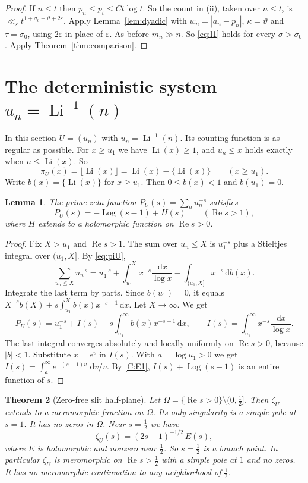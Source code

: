 \documentclass[12pt,letterpaper]{article}
\newtheorem{theorem}{Theorem}[section]
\newtheorem{lemma}[theorem]{Lemma}
\theoremstyle{definition}
\theoremstyle{remark}
\numberwithin{equation}{section}
\newcommand{\Li}{\operatorname{Li}}
\newcommand{\Log}{\operatorname{Log}}
\newcommand{\Ree}{\operatorname{Re}}
\newcommand{\dd}{\,\mathrm{d}}
\newcommand{\eps}{\varepsilon}
\begin{document}
\begin{proof}
If $n\le t$ then $p_n\le p_t\le Ct\log t$. So the count in (ii), taken over
$n\le t$, is $\ll_\eps t^{1+\sigma_0-\vartheta+2\eps}$. Apply
Lemma~\ref{lem:dyadic} with $w_n=|a_n-p_n|$, $\kappa=\vartheta$ and
$\tau=\sigma_0$, using $2\eps$ in place of $\eps$. As before
$m_n\gg n$. So \eqref{eq:l1} holds for every $\sigma>\sigma_0$. Apply
Theorem~\ref{thm:comparison}.
\end{proof}

\section{The deterministic system \texorpdfstring{$u_n=\Li^{-1}(n)$}{u\_n = Li\^{}(-1)(n)}}
\label{sec:deterministic}

In this section $U=(u_n)$ with $u_n=\Li^{-1}(n)$. Its counting function is
as regular as possible. For $x\ge u_1$ we have $\Li(x)\ge1$, and $u_n\le x$
holds exactly when $n\le\Li(x)$. So
\begin{equation}\label{eq:piU}
\pi_U(x)=\lfloor\Li(x)\rfloor=\Li(x)-\{\Li(x)\}\qquad(x\ge u_1).
\end{equation}
Write $b(x)=\{\Li(x)\}$ for $x\ge u_1$. Then $0\le b(x)<1$ and $b(u_1)=0$.

\begin{lemma}\label{lem:PU}
The prime zeta function $P_U(s)=\sum_n u_n^{-s}$ satisfies
\[
P_U(s)=-\Log(s-1)+H(s)\qquad(\Ree s>1),
\]
where $H$ extends to a holomorphic function on $\Ree s>0$.
\end{lemma}

\begin{proof}
Fix $X>u_1$ and $\Ree s>1$. The sum over $u_n\le X$ is $u_1^{-s}$ plus a
Stieltjes integral over $(u_1,X]$. By \eqref{eq:piU},
\[
\sum_{u_n\le X}u_n^{-s}
=u_1^{-s}+\int_{u_1}^X x^{-s}\frac{\dd x}{\log x}
-\int_{(u_1,X]}x^{-s}\dd b(x).
\]
Integrate the last term by parts. Since $b(u_1)=0$, it equals
$X^{-s}b(X)+s\int_{u_1}^X b(x)x^{-s-1}\dd x$. Let $X\to\infty$. We get
\[
P_U(s)=u_1^{-s}+I(s)-s\int_{u_1}^\infty b(x)x^{-s-1}\dd x,
\qquad I(s)=\int_{u_1}^\infty x^{-s}\frac{\dd x}{\log x}.
\]
The last integral converges absolutely and locally uniformly on $\Ree s>0$,
because $|b|<1$. Substitute $x=e^v$ in $I(s)$. With $a=\log u_1>0$ we get
$I(s)=\int_a^\infty e^{-(s-1)v}\,\dd v/v$. By \ref{C:E1}, $I(s)+\Log(s-1)$
is an entire function of $s$.
\end{proof}

\begin{theorem}[Zero-free slit half-plane]\label{thm:slit}
Let $\Omega=\{\Ree s>0\}\setminus(0,\tfrac12]$. Then $\zeta_U$ extends to a
meromorphic function on $\Omega$. Its only singularity is a simple pole at
$s=1$. It has no zeros in $\Omega$. Near $s=\frac12$ we have
\[
\zeta_U(s)=(2s-1)^{-1/2}\,E(s),
\]
where $E$ is holomorphic and nonzero near $\tfrac12$. So $s=\tfrac12$ is a
branch point. In particular $\zeta_U$ is meromorphic on $\Ree s>\tfrac12$
with a simple pole at $1$ and no zeros. It has no meromorphic
continuation to any neighborhood of $\tfrac12$.
\end{theorem}
\end{document}

